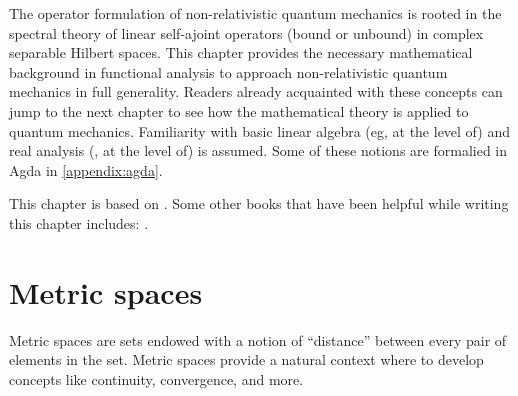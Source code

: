 




\begin{refsection}


The operator formulation of non-relativistic quantum mechanics is rooted in the spectral theory of linear self-ajoint operators (bound or unbound) in complex separable Hilbert spaces.
This chapter provides the necessary mathematical background in functional analysis to approach non-relativistic quantum mechanics in full generality. 
Readers already acquainted with these concepts can jump to the next chapter to see how the mathematical theory is applied to quantum mechanics. 
  Familiarity with basic linear algebra (eg, at the level of) and real analysis (\eg, at the level of) is assumed. 
  Some of these notions are formalied in Agda in \cref{appendix:agda}.


This chapter is based on \textcite{Reed.Simon:1980}. 
Some other books that have been helpful while writing this chapter includes:
\textcite{Teschl:2009,Berberian:1976,Hutson.Pym:1980,Debnath.Mikusinski:2005,Helmberg:1969}.

  \section{Metric spaces}

  Metric spaces are sets endowed with a notion of ``distance'' between every pair of elements in the set.
Metric spaces provide a natural context where to develop concepts like continuity, convergence, and more.


\end{refsection}
